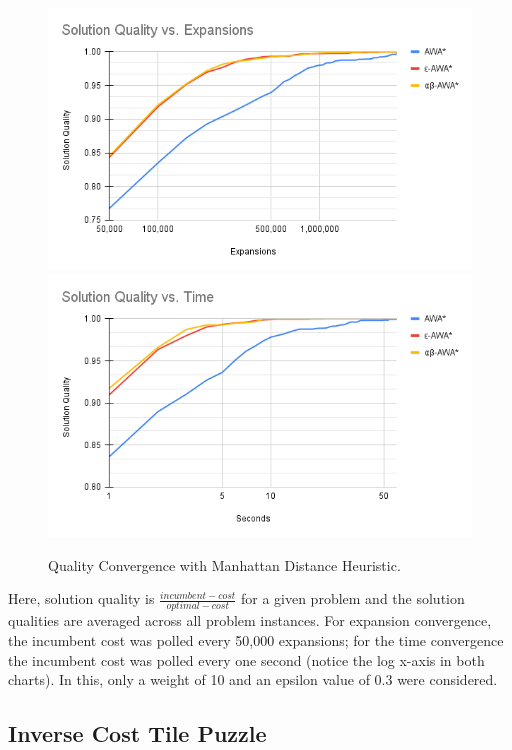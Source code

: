 \begin{figure}
    \includegraphics[width=\linewidth]{media/man-Solution Quality vs. Expansions.png}
    \includegraphics[width=\linewidth]{media/man-Solution Quality vs. Time.png}
    \caption{Quality Convergence with Manhattan Distance Heuristic.} \label{fig:conv-man}
\end{figure}

Here, solution quality is $\frac{incumbent-cost}{optimal-cost}$ for a given problem and the solution qualities are averaged across all problem instances. For expansion convergence, the incumbent cost was polled every 50,000 expansions; for the time convergence the incumbent cost was polled every one second (notice the log x-axis in both charts). In this, only a weight of 10 and an epsilon value of 0.3 were considered. 

\subsection{Inverse Cost Tile Puzzle}

